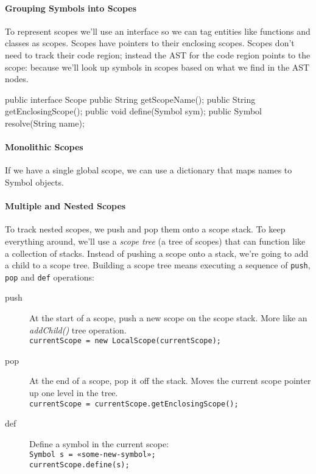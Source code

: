 \paragraph{Grouping Symbols into Scopes}
To represent scopes we'll use an interface
so we can tag entities like functions and classes as scopes.
Scopes have pointers to their enclosing scopes.
Scopes don't need to track their code region;
instead the AST for the code region points to the scope:
because we'll look up symbols in scopes based on what we find in the AST nodes.

\begin{verbatimtab}
public interface Scope {
	public String getScopeName();
	public String getEnclosingScope();
	public void define(Symbol sym);
	public Symbol resolve(String name);
}
\end{verbatimtab}

\paragraph{Monolithic Scopes}
If we have a single global scope,
we can use a dictionary that maps names to Symbol objects.

\paragraph{Multiple and Nested Scopes}
To track nested scopes, we push and pop them onto a scope stack.
To keep everything around, we'll use a \emph{scope tree} (a tree of scopes)
that can function like a collection of stacks.
Instead of pushing a scope onto a stack,
we're going to add a child to a scope tree.
Building a scope tree means executing a sequence of
\verb=push=, \verb=pop= and \verb=def= operations:

\begin{description}
\item[push]
At the start of a scope, push a new scope on the scope stack.
More like an \emph{addChild()} tree operation.\\
\verb+currentScope = new LocalScope(currentScope);+

\item[pop]
At the end of a scope, pop it off the stack.
Moves the current scope pointer up one level in the tree.\\
\verb+currentScope = currentScope.getEnclosingScope();+

\item[def]
Define a symbol in the current scope:\\
\verb+Symbol s = «some-new-symbol»;+\\
\verb+currentScope.define(s);+
\end{description}

